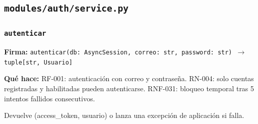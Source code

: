 \documentclass[11pt,a4paper]{article}
\begin{document}
\subsection{\texttt{modules/auth/service.py}}

\subsubsection*{\texttt{autenticar}}
\textbf{Firma:} \texttt{autenticar(db: AsyncSession, correo: str, password: str) $\rightarrow$ tuple[str, Usuario]}

\textbf{Qué hace:} RF-001: autenticación con correo y contraseña.
RN-004: solo cuentas registradas y habilitadas pueden autenticarse.
RNF-031: bloqueo temporal tras 5 intentos fallidos consecutivos.

Devuelve (access\_token, usuario) o lanza una excepción de aplicación si falla.
\end{document}
